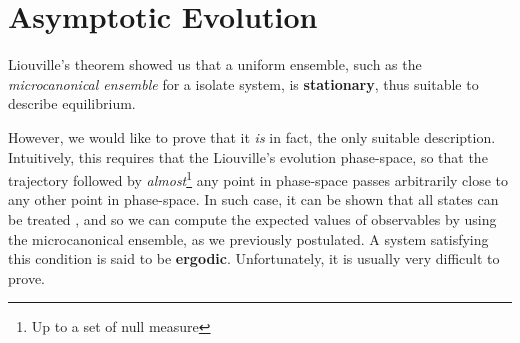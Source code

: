 \documentclass[../template.tex]{subfiles}
\begin{document}
\section{Asymptotic Evolution}
Liouville's theorem showed us that a uniform ensemble, such as the \textit{microcanonical ensemble} for a isolate system, is \textbf{stationary}, thus suitable to describe equilibrium.

However, we would like to prove that it \textit{is} in fact, the only suitable description. Intuitively, this requires that the Liouville's evolution  phase-space, so that the trajectory followed by \textit{almost}\footnote{Up to a set of null measure} any point in phase-space passes arbitrarily close to any other point in phase-space. In such case, it can be shown that all states can be treated , and so we can compute the expected values of observables by using the microcanonical ensemble, as we previously postulated. A system satisfying this condition is said to be \textbf{ergodic}. Unfortunately, it is usually very difficult to prove.

\medskip
\end{document}
